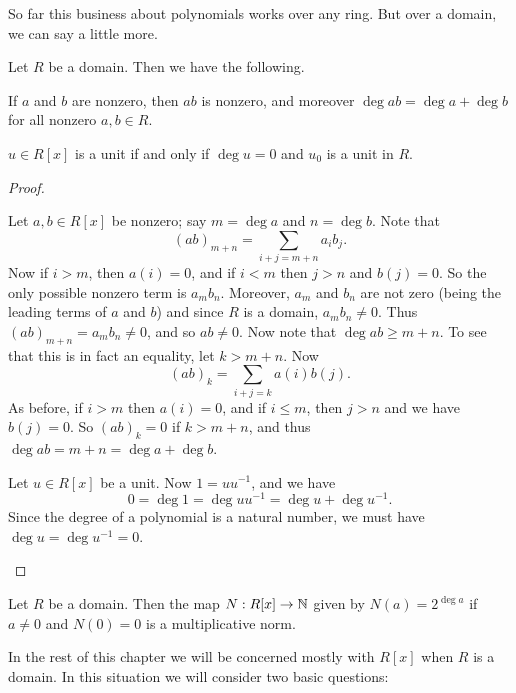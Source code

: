 So far this business about polynomials works over any ring.
But over a domain, we can say a little more.

\begin{prop}
Let \(R\) be a domain.
Then we have the following.
\begin{proplist*}
\item If \(a\) and \(b\) are nonzero, then \(ab\) is nonzero, and moreover \(\deg{ab} = \deg{a} + \deg{b}\) for all nonzero \(a,b \in R\).
\item \(u \in R[x]\) is a unit if and only if \(\deg{u} = 0\) and \(u_0\) is a unit in \(R\).
\end{proplist*}
\end{prop}

\begin{proof}
\begin{inlineproplist}
\item Let \(a,b \in R[x]\) be nonzero; say \(m = \deg{a}\) and \(n = \deg{b}\).
Note that \[ (ab)_{m+n} = \sum_{i+j = m+n} a_ib_j. \] Now if \(i > m\), then \(a(i) = 0\), and if \(i < m\) then \(j > n\) and \(b(j) = 0\).
So the only possible nonzero term is \(a_mb_n\).
Moreover, \(a_m\) and \(b_n\) are not zero (being the leading terms of \(a\) and \(b\)) and since \(R\) is a domain, \(a_mb_n \neq 0\).
Thus \((ab)_{m+n} = a_mb_n \neq 0\), and so \(ab \neq 0\).
Now note that \(\deg{ab} \geq m+n\).
To see that this is in fact an equality, let \(k > m+n\).
Now \[ (ab)_k = \sum_{i+j = k} a(i)b(j). \] As before, if \(i > m\) then \(a(i) = 0\), and if \(i \leq m\), then \(j > n\) and we have \(b(j) = 0\).
So \((ab)_k = 0\) if \(k > m+n\), and thus \(\deg{ab} = m+n = \deg{a} + \deg{b}\).
\item Let \(u \in R[x]\) be a unit.
Now \(1 = uu^{-1}\), and we have \[ 0 = \deg{1} = \deg{uu^{-1}} = \deg{u} + \deg{u^{-1}}. \] Since the degree of a polynomial is a natural number, we must have \(\deg{u} = \deg{u^{-1}} = 0\).
\end{inlineproplist}
\end{proof}

\begin{cor}
Let \(R\) be a domain.
Then the map \(N : R[x] \rightarrow \mathbb{N}\) given by \(N(a) = 2^{\deg{a}}\) if \(a \neq 0\) and \(N(0) = 0\) is a multiplicative norm.
\end{cor}

In the rest of this chapter we will be concerned mostly with \(R[x]\) when \(R\) is a domain.
In this situation we will consider two basic questions:

